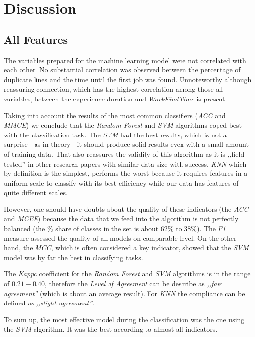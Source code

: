 \section{Discussion}
\label{sec:discussion}

\subsection{All Features}

The variables prepared for the machine learning model were not correlated with each other. No substantial correlation was observed between the percentage of duplicate lines and the time until the first job was found. Unnoteworthy although reassuring connection, which has the highest correlation among those all variables, between the experience duration and \emph{WorkFindTime} is present. 

Taking into account the results of the most common classifiers (\emph{ACC} and \emph{MMCE}) we conclude that the \emph{Random Forest} and \emph{SVM} algorithms coped best with the classification task. The \emph{SVM} had the best results, which is not a surprise - as in theory - it should produce solid results even with a small amount of training data. That also reassures the validity of this algorithm as it is ,,field-tested'' in other research papers with similar data size with success. \emph{KNN} which by definition is the simplest, performs the worst because it requires features in a uniform scale to classify with its best efficiency while our data has features of quite different scales.

However, one should have doubts about the quality of these indicators (the \emph{ACC} and \emph{MCEE}) because the data that we feed into the algorithm is not perfectly balanced (the $\%$ share of classes in the set is about $62\%$ to $38\%$). The \emph{F1} measure assessed the quality of all models on comparable level. On the other hand, the \emph{MCC}, which is often considered a key indicator, showed that the \emph{SVM} model was by far the best in classifying tasks.

The \emph{Kappa} coefficient for the \emph{Random Forest} and \emph{SVM} algorithms is in the range of $0.21 - 0.40$, therefore the \emph{Level of Agreement} can be describe as \emph{,,fair agreement''} (which is about an average result). For \emph{KNN} the compliance can be defined as \emph{,,slight agreement''}.

To sum up, the most effective model during the classification was the one using the \emph{SVM} algorithm. It was the best according to almost all indicators.

